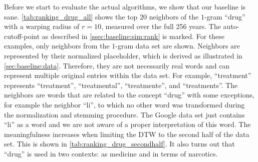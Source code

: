 Before we start to evaluate the actual algorithms, we show that our baseline is sane. \autoref{tab:ranking_drug_all} shows the top \num{20} neighbors of the $1$-gram \enquote{drug} with a warping radius of $r = 10$, measured over the full \num{256} years. The auto-cutoff-point as described in \autoref{ssec:baseline:sim:rank} is marked. For these examples, only neighbors from the $1$-gram data set are shown. Neighbors are represented by their normalized placeholder, which is derived as illustrated in \autoref{sec:baseline:data}. Therefore, they are not necessarily real words and can represent multiple original entries within the data set. For example, \enquote{treatment} represents \enquote{treatment}, \enquote{treatmental}, \enquote{treatmente}, and \enquote{treatments}. The neighbors are words that are related to the concept \enquote{drug} with some exceptions, for example the neighbor \enquote{li}, to which no other word was transformed during the normalization and stemming procedure. The Google data set just contains \enquote{li} as a word and we are not aware of a proper interpretation of this word. The meaningfulness increases when limiting the DTW to the second half of the data set. This is shown in \autoref{tab:ranking_drug_secondhalf}. It also turns out that \enquote{drug} is used in two contexts: as medicine and in terms of narcotics.


